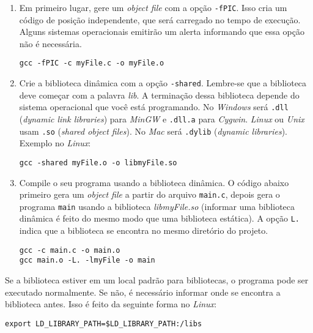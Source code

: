\documentclass[12pt, a4paper]{article}
\begin{document}
\begin{enumerate}

\item Em primeiro lugar, gere um \textit{object file} com a opção \verb|-fPIC|. Isso cria um código de posição independente, que será carregado no tempo de execução. Alguns sistemas operacionais emitirão um alerta informando que essa opção não é necessária.

\begin{verbatim}
gcc -fPIC -c myFile.c -o myFile.o
\end{verbatim}

\item Crie a biblioteca dinâmica com a opção \verb|-shared|. Lembre-se que a biblioteca deve começar com a palavra \textit{lib}. A terminação dessa biblioteca depende do sistema operacional que você está programando. No \textit{Windows} será \verb|.dll| (\textit{dynamic link libraries}) para \textit{MinGW} e \verb|.dll.a| para \textit{Cygwin}. \textit{Linux} ou \textit{Unix} usam \verb|.so| (\textit{shared object files}). No \textit{Mac} será \verb|.dylib| (\textit{dynamic libraries}). Exemplo no \textit{Linux}:

\begin{verbatim}
gcc -shared myFile.o -o libmyFile.so
\end{verbatim}

\item Compile o seu programa usando a biblioteca dinâmica. O código abaixo primeiro gera um \textit{object file} a partir do arquivo \verb|main.c|, depois gera o programa \verb|main| usando a biblioteca \textit{libmyFile.so} (informar uma biblioteca dinâmica é feito do mesmo modo que uma biblioteca estática). A opção \verb|L.| indica que a biblioteca se encontra no mesmo diretório do projeto.

\begin{verbatim}
gcc -c main.c -o main.o
gcc main.o -L. -lmyFile -o main
\end{verbatim}

\end{enumerate}

Se a biblioteca estiver em um local padrão para bibliotecas, o programa pode ser executado normalmente. Se não, é necessário informar onde se encontra a biblioteca antes. Isso é feito da seguinte forma no \textit{Linux}:

\begin{verbatim}
export LD_LIBRARY_PATH=$LD_LIBRARY_PATH:/libs
\end{verbatim}
\end{document}
